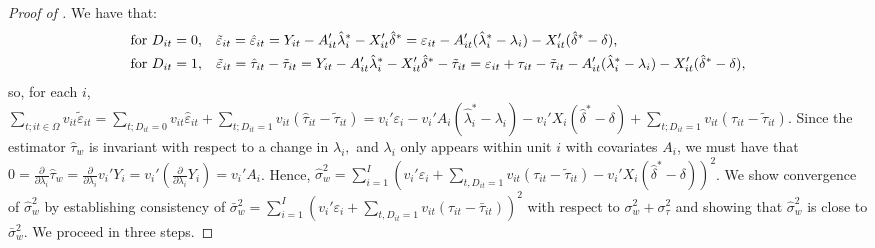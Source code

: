 \documentclass[english,11pt]{article}
\theoremstyle{plain}
\theoremstyle{plain}
\theoremstyle{plain}
\theoremstyle{plain}
\let\ref\Cref
\begin{document}
\begin{proof}[Proof of \ref{thm:se}]
We have that:
\begin{align*}
\text{for \ensuremath{D_{it}}} & =0, & \tilde{\varepsilon}_{it}=\hat{\varepsilon}_{it} & =Y_{it}-A_{it}'\hat{\lambda}_{i}^{*}-X_{it}'\hat{\delta}^{*}=\varepsilon_{it}-A_{it}'(\hat{\lambda}_{i}^{*}-\lambda_{i})-X_{it}'(\hat{\delta}^{*}-\delta),\\
\text{for \ensuremath{D_{it}}} & =1, & \tilde{\varepsilon}_{it}=\hat{\tau}_{it} & -\tilde{\tau}_{it}=Y_{it}-A_{it}'\hat{\lambda}_{i}^{*}-X_{it}'\hat{\delta}^{*}-\tilde{\tau}_{it}=\varepsilon_{it}+\tau_{it}-\tilde{\tau}_{it}-A_{it}'(\hat{\lambda}_{i}^{*}-\lambda_{i})-X_{it}'(\hat{\delta}^{*}-\delta),
\end{align*}
so, for each $i$, $\sum_{t;it\in\Omega}v_{it}\tilde{\varepsilon}_{it}=\sum_{t;D_{it}=0}v_{it}\hat{\varepsilon}_{it}+\sum_{t;D_{it}=1}v_{it}(\hat{\tau}_{it}-\tilde{\tau}_{it})=v_{i}'\varepsilon_{i}-v_{i}'A_{i}(\hat{\lambda}_{i}^{*}-\lambda_{i})-v_{i}'X_{i}(\hat{\delta}^{*}-\delta)+\sum_{t;D_{it}=1}v_{it}(\tau_{it}-\tilde{\tau}_{it})$.
Since the estimator $\hat{\tau}_{w}$ is invariant with respect to
a change in $\lambda_{i},$ and $\lambda_{i}$ only appears within
unit $i$ with covariates $A_{i}$, we must have that $0=\frac{\partial}{\partial\lambda_{i}}\hat{\tau}_{w}=\frac{\partial}{\partial\lambda_{i}}v_{i}'Y_{i}=v_{i}'\left(\frac{\partial}{\partial\lambda_{i}}Y_{i}\right)=v_{i}'A_{i}$.
Hence, $\hat{\sigma}_{w}^{2}=\sum_{i=1}^{I}\left(v_{i}'\varepsilon_{i}+\sum_{t,D_{it}=1}v_{it}(\tau_{it}-\tilde{\tau}_{it})-v_{i}'X_{i}(\hat{\delta}^{*}-\delta)\right)^{2}$.
We show convergence of $\hat{\sigma}_{w}^{2}$ by establishing consistency
of $\bar{\sigma}_{w}^{2}=\sum_{i=1}^{I}\left(v_{i}'\varepsilon_{i}+\sum_{t,D_{it}=1}v_{it}\allowbreak(\tau_{it}-\bar{\tau}_{it})\right)^{2}$
with respect to $\sigma_{w}^{2}+\sigma_{\tau}^{2}$ and showing that
$\hat{\sigma}_{w}^{2}$ is close to $\bar{\sigma}_{w}^{2}$. We proceed
in three steps.


\end{proof}
\end{document}
